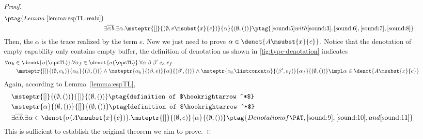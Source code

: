 \begin{proof}
{\begin{alignat}{2}
    \ptag{Lemma~\ref{lemma:espTL-realz}} \label{sound:8}
    \\&\exists \overline{c{:}b}. \exists \alpha. \msteptr{[]}{(\emptyset, e\msubst{x}{c})}{\alpha}{(\emptyset, ())} 
    \ptag{\ref{sound:5} with \ref{sound:3},  \ref{sound:6}, \ref{sound:7}, \ref{sound:8}} \label{sound:9}
\end{alignat}}\noindent
Then, the $\alpha$ is the trace realized by the term $e$. Now we just need to prove $\alpha \in \denot{A\msubst{x}{c}}$.
Notice that the denotation of empty capability only contains empty buffer, 
the definition of \PAT denotation as shown in \autoref{fig:type-denotation} indicates
{\footnotesize\begin{align*}
    &\forall \alpha_h \in\denot{\sigma(\epsTL)}.\forall \alpha_f \in\denot{\sigma(\epsTL)}. \forall \alpha\; \beta\;\beta'\;e_h\;e_f.
  \\&\qquad \msteptr{[]}{(\emptyset, e_h)}{\alpha_h}{(\beta, ())}\land \msteptr{\alpha_h}{(\beta, e)}{\alpha}{(\beta', ())} \land \msteptr{\alpha_h \listconcat \alpha }{(\beta', e_f)}{\alpha_f}{(\emptyset, ())} \impl \alpha \in\denot{A\msubst{x}{c}}
\end{align*}}\noindent
Again, according to Lemma~\ref{lemma:espTL},
{\footnotesize\begin{alignat}{2}
  &\msteptr{[]}{(\emptyset, ())}{[]}{(\emptyset, ())} \ptag{definition of $\hookrightarrow^*$} \label{sound:10}
  \\&\msteptr{\alpha}{(\emptyset, ())}{[]}{(\emptyset, ())} \ptag{definition of $\hookrightarrow^*$} \label{sound:11}
  \\&\exists \overline{c{:}b}.\exists \alpha \in\denot{\sigma(A\msubst{x}{c})}. \msteptr{[]}{(\emptyset, e)}{\alpha}{(\emptyset, ())}
\ptag{Denotation of \PAT, \ref{sound:9},\ref{sound:10}, and \ref{sound:11}}
  \label{sound:12}
\end{alignat}}\noindent
This is sufficient to establish the original theorem we aim to prove.
\end{proof}



